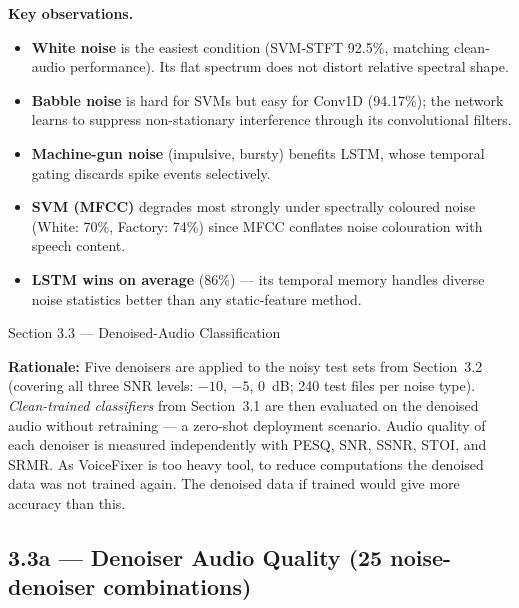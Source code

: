 \documentclass[12pt,a4paper,onecolumn]{exam}
\newcommand{\questionheader}[1]{%
  \begin{tcolorbox}[
    enhanced,
    colback=black,
    coltext=white,
    boxrule=0pt,
    fontupper=\Large\bfseries,
    arc=4mm
  ]
  #1
  \end{tcolorbox}%
}
\begin{document}
\noindent\textbf{Key observations.}
\begin{itemize}\setlength\itemsep{1pt}
  \item \textbf{White noise} is the easiest condition (SVM-STFT 92.5\%, matching clean-audio performance). Its flat spectrum does not distort relative spectral shape.
  \item \textbf{Babble noise} is hard for SVMs but easy for Conv1D (94.17\%); the network learns to suppress non-stationary interference through its convolutional filters.
  \item \textbf{Machine-gun noise} (impulsive, bursty) benefits LSTM, whose temporal gating discards spike events selectively.
  \item \textbf{SVM (MFCC)} degrades most strongly under spectrally coloured noise (White: 70\%, Factory: 74\%) since MFCC conflates noise colouration with speech content.
  \item \textbf{LSTM wins on average} (86\%) --- its temporal memory handles diverse noise statistics better than any static-feature method.
\end{itemize}

\phantom{123}

\questionheader{Section 3.3 --- Denoised-Audio Classification}

\noindent\textbf{Rationale:}
Five denoisers are applied to the noisy test sets from Section~3.2 (covering all three SNR levels: $-10$, $-5$, $0$~dB; 240 test files per noise type).
\emph{Clean-trained classifiers} from Section~3.1 are then evaluated on the denoised audio
without retraining --- a zero-shot deployment scenario.
Audio quality of each denoiser is measured independently with PESQ, SNR, SSNR, STOI, and SRMR. As VoiceFixer is too heavy tool, to reduce computations the denoised data was not trained again. The denoised data if trained would give more accuracy than this. 

\subsection*{3.3a --- Denoiser Audio Quality (25 noise-denoiser combinations)}
\end{document}
